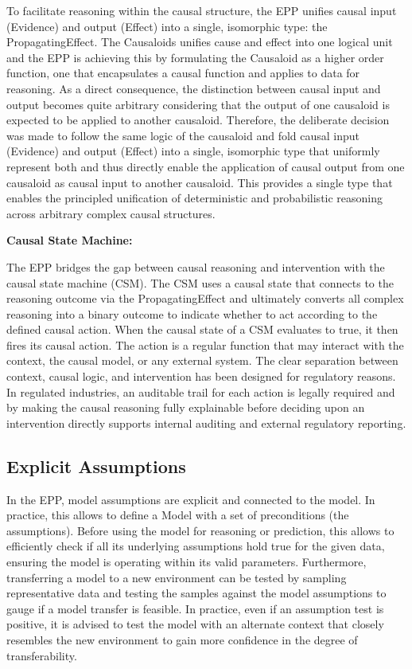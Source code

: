 To facilitate reasoning within the causal structure, the EPP unifies causal input (Evidence) and output (Effect) into a single, isomorphic type: the PropagatingEffect. The Causaloids unifies cause and effect into one logical unit and the EPP is achieving this by formulating the Causaloid as a higher order function, one that encapsulates a causal function and applies to data for reasoning. As a direct consequence, the distinction between causal input and output becomes quite arbitrary considering that the output of one causaloid is expected to be applied to another causaloid. Therefore, the deliberate decision was made to follow the same logic of the causaloid and fold causal input (Evidence) and output (Effect) into a single, isomorphic type that uniformly represent both and thus directly enable the application of causal output from one causaloid as causal input to another causaloid. This provides a single type that enables the principled unification of deterministic and probabilistic reasoning across arbitrary complex causal structures. 
 

\textbf{Causal State Machine:}

The EPP bridges the gap between causal reasoning and intervention with the causal state machine (CSM). The CSM uses a causal state that connects to the reasoning outcome via the  PropagatingEffect and ultimately converts all complex reasoning into a binary outcome to indicate whether to act according to the defined causal action. When the causal state of a CSM evaluates to true, it then fires its causal action. The action is a regular function that may interact with the context, the causal model, or any external system. The clear separation between context, causal logic, and intervention has been designed for regulatory reasons. In regulated industries, an auditable trail for each action is legally required  and by making the causal reasoning fully explainable before deciding upon an intervention directly supports internal auditing and external regulatory reporting.   

%
%
\subsection{Explicit Assumptions}
\label{sec:assumptions}
 
 In the EPP, model assumptions are explicit and connected to the model.  In practice, this allows to define a Model with a set of preconditions (the
  assumptions). Before using the model for reasoning or prediction, this allows to efficiently check if all its underlying
  assumptions hold true for the given data, ensuring the model is operating within its  valid parameters. Furthermore, transferring a model to a new environment can be
  tested by sampling representative data and testing the samples against the model assumptions to gauge if a model transfer is feasible. In practice, even if an assumption test is positive, it is advised to test the model with an alternate context that closely resembles the new environment to gain more confidence in the degree of transferability. 
 
